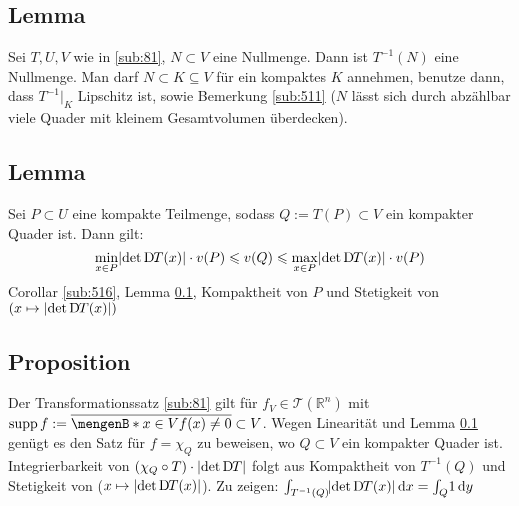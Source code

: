 \subsection[Lemma: Urbild einer Nullmenge unter einen $C^1$-Diffeomorphismus]{Lemma} %
\label{sub:82}
Sei $T, U,V$ wie in \ref{sub:81}, $N \subset V$ eine Nullmenge. Dann ist $T ^{-1}(N)$ eine Nullmenge.
Man darf $N \subset K \subseteq V$ für ein kompaktes $K$ annehmen, benutze dann, dass $T ^{-1}\big|_K$ Lipschitz ist, sowie Bemerkung \ref{sub:511} ($N$ lässt sich durch
abzählbar viele Quader mit kleinem Gesamtvolumen überdecken). \bewende

\subsection[Lemma: Abschätzungen für das Volumen eines Quaders mit kompaktem Urbild]{Lemma} %
\label{sub:83}
Sei $P \subset U$ eine kompakte Teilmenge, sodass $Q := T(P) \subset V$ ein kompakter Quader ist. Dann gilt:
\[
	\min_{x \in P} \abs*{\det \D T(x)} \cdot v(P) \le v(Q)\le \max_{x \in P} \abs*{\det \D T(x)} \cdot v(P)
\]
Corollar \ref{sub:516}, Lemma \ref{sub:82}, Kompaktheit von $P$ und Stetigkeit von $( x \mapsto \abs*{\det \D T(x)} )$ \bewende

\subsection[Proposition: Transformationssatz für Treppenfunktionen]{Proposition} %
\label{sub:84}
Der Transformationssatz \ref{sub:81} gilt für $f_V \in \mathcal{T}(\mathds{R}^n) $ mit $\supp f := \overline{\set[x \in V]{f(x)\not= 0}} \subset V $.
Wegen Linearität  und Lemma \ref{sub:82} genügt es den Satz für $f = \chi_Q$ zu beweisen, wo $Q \subset V$ ein kompakter Quader ist.
Integrierbarkeit von $(\chi_Q \circ T) \cdot \abs*{\det \D T} $ folgt aus Kompaktheit von $T ^{-1}(Q)$ und Stetigkeit von ($x \mapsto \abs*{\det \D T(x)} $).
Zu zeigen: $\int_{T ^{-1}(Q)}\! \abs*{\det \D T(x)}  \, \mathrm{d}x  = \int_Q\! 1  \, \mathrm{d}y $

